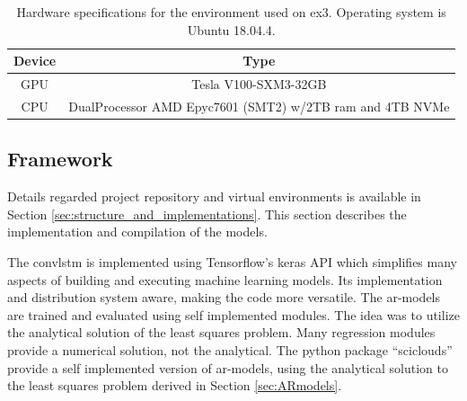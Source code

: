 \begin{table}[ht]
    \centering
    \begin{tabular}{c|c}
        Device &  Type  \\ \hline
        GPU & Tesla V100-SXM3-32GB \\
        CPU & DualProcessor AMD Epyc7601 (SMT2) w/2TB ram and 4TB NVMe 
    \end{tabular}
    \caption{Hardware specifications for the environment used on \acrshort{ex3}. Operating system is Ubuntu 18.04.4.}
    \label{tab:hardware_ex3}
\end{table}

\subsection{Framework} \label{sec:framework}
Details regarded project repository and virtual environments is available in Section \ref{sec:structure_and_implementations}. This section describes the implementation and compilation of the models.

The \acrshort{convlstm} is implemented using Tensorflow's keras API which simplifies many aspects of building and executing machine learning models. Its implementation and distribution system aware, making the code more versatile. %
The \acrshort{ar}-models are trained and evaluated using self implemented modules. The idea was to utilize the analytical solution of the least squares problem. Many regression modules provide a numerical solution, not the analytical. The python package ``sciclouds'' provide a self implemented version of \acrshort{ar}-models, using the analytical solution to the least squares problem derived in Section \ref{sec:ARmodels}.


